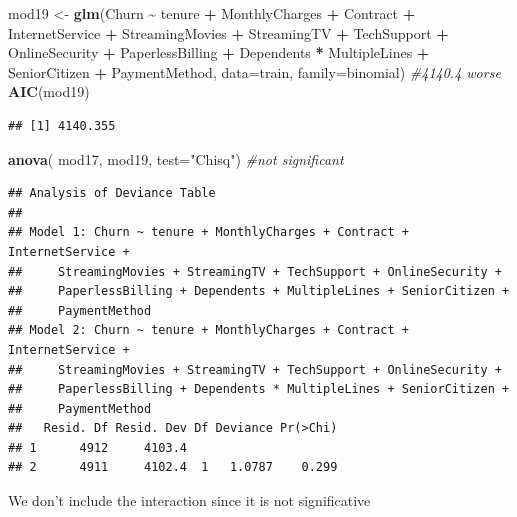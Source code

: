 \documentclass[
  twoside]{article}
\newenvironment{Shaded}{\begin{snugshade}}{\end{snugshade}}
\newcommand{\AttributeTok}[1]{\textcolor[rgb]{0.13,0.29,0.53}{#1}}
\newcommand{\CommentTok}[1]{\textcolor[rgb]{0.56,0.35,0.01}{\textit{#1}}}
\newcommand{\FunctionTok}[1]{\textcolor[rgb]{0.13,0.29,0.53}{\textbf{#1}}}
\newcommand{\NormalTok}[1]{#1}
\newcommand{\OtherTok}[1]{\textcolor[rgb]{0.56,0.35,0.01}{#1}}
\newcommand{\SpecialCharTok}[1]{\textcolor[rgb]{0.81,0.36,0.00}{\textbf{#1}}}
\newcommand{\StringTok}[1]{\textcolor[rgb]{0.31,0.60,0.02}{#1}}
\begin{document}
\begin{Shaded}
\begin{Highlighting}[]
\NormalTok{mod19 }\OtherTok{\textless{}{-}} \FunctionTok{glm}\NormalTok{(Churn }\SpecialCharTok{\textasciitilde{}}\NormalTok{ tenure }\SpecialCharTok{+}\NormalTok{ MonthlyCharges }\SpecialCharTok{+}\NormalTok{ Contract }\SpecialCharTok{+}\NormalTok{ InternetService }\SpecialCharTok{+} 
\NormalTok{               StreamingMovies }\SpecialCharTok{+}\NormalTok{ StreamingTV }\SpecialCharTok{+}\NormalTok{ TechSupport }\SpecialCharTok{+}\NormalTok{ OnlineSecurity }\SpecialCharTok{+}
\NormalTok{               PaperlessBilling }\SpecialCharTok{+}\NormalTok{ Dependents }\SpecialCharTok{*}\NormalTok{ MultipleLines }\SpecialCharTok{+}\NormalTok{ SeniorCitizen }\SpecialCharTok{+} 
\NormalTok{               PaymentMethod, }\AttributeTok{data=}\NormalTok{train, }\AttributeTok{family=}\NormalTok{binomial)}
 \CommentTok{\#4140.4 worse}
\FunctionTok{AIC}\NormalTok{(mod19)}
\end{Highlighting}
\end{Shaded}

\begin{verbatim}
## [1] 4140.355
\end{verbatim}

\begin{Shaded}
\begin{Highlighting}[]
\FunctionTok{anova}\NormalTok{( mod17, mod19,  }\AttributeTok{test=}\StringTok{"Chisq"}\NormalTok{) }\CommentTok{\#not significant}
\end{Highlighting}
\end{Shaded}

\begin{verbatim}
## Analysis of Deviance Table
## 
## Model 1: Churn ~ tenure + MonthlyCharges + Contract + InternetService + 
##     StreamingMovies + StreamingTV + TechSupport + OnlineSecurity + 
##     PaperlessBilling + Dependents + MultipleLines + SeniorCitizen + 
##     PaymentMethod
## Model 2: Churn ~ tenure + MonthlyCharges + Contract + InternetService + 
##     StreamingMovies + StreamingTV + TechSupport + OnlineSecurity + 
##     PaperlessBilling + Dependents * MultipleLines + SeniorCitizen + 
##     PaymentMethod
##   Resid. Df Resid. Dev Df Deviance Pr(>Chi)
## 1      4912     4103.4                     
## 2      4911     4102.4  1   1.0787    0.299
\end{verbatim}

We don't include the interaction since it is not significative
\end{document}
